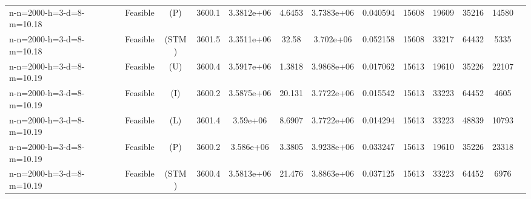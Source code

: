 \documentclass[landscape, a4paper]{article}
\newcommand{\STM}{\ensuremath{\mathrm{STM}}}
\newcommand{\Improved}{\ensuremath{\mathrm{I}}}
\newcommand{\Loose}{\ensuremath{\mathrm{L}}}
\newcommand{\Profit}{\ensuremath{\mathrm{P}}}
\newcommand{\Utility}{\ensuremath{\mathrm{U}}}
\begin{document}
\begin{center}
\begin{tabular}{lcccccccccccc}
n-n=2000-h=3-d=8-m=10.18 & Feasible & (\Profit) & 3600.1 & 3.3812e+06 & 4.6453 & 3.7383e+06 & 0.040594 & 15608 & 19609 & 35216 & 14580 & \\
n-n=2000-h=3-d=8-m=10.18 & Feasible & (\STM) & 3601.5 & 3.3511e+06 & 32.58 & 3.702e+06 & 0.052158 & 15608 & 33217 & 64432 & 5335 & \\
n-n=2000-h=3-d=8-m=10.19 & Feasible & (\Utility) & 3600.4 & 3.5917e+06 & 1.3818 & 3.9868e+06 & 0.017062 & 15613 & 19610 & 35226 & 22107 & \\
n-n=2000-h=3-d=8-m=10.19 & Feasible & (\Improved) & 3600.2 & 3.5875e+06 & 20.131 & 3.7722e+06 & 0.015542 & 15613 & 33223 & 64452 & 4605 & \\
n-n=2000-h=3-d=8-m=10.19 & Feasible & (\Loose) & 3601.4 & 3.59e+06 & 8.6907 & 3.7722e+06 & 0.014294 & 15613 & 33223 & 48839 & 10793 & \\
n-n=2000-h=3-d=8-m=10.19 & Feasible & (\Profit) & 3600.2 & 3.586e+06 & 3.3805 & 3.9238e+06 & 0.033247 & 15613 & 19610 & 35226 & 23318 & \\
n-n=2000-h=3-d=8-m=10.19 & Feasible & (\STM) & 3600.4 & 3.5813e+06 & 21.476 & 3.8863e+06 & 0.037125 & 15613 & 33223 & 64452 & 6976 & \\
\end{tabular}
\end{center}
\end{document}
